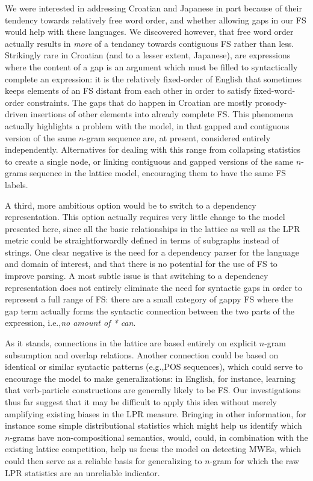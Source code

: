 \documentclass[11pt]{article}
\makeatletter
\def \eg {e.g.,\@ }
\def \ie {i.e.,\@ }
\newcommand{\ex}[1]{\textit{#1}\xspace}
\makeatother
\begin{document}
We were interested in addressing Croatian and Japanese in part because of their tendency towards relatively free word order, and whether allowing gaps in our FS would help with these languages. We discovered however, that free word order actually results in \emph{more} of a tendancy towards contiguous FS rather than less. Strikingly rare in Croatian (and to a lesser extent, Japanese), are expressions where the content of a gap is an argument which must be filled to syntactically complete an expression: it is the relatively fixed-order of English that sometimes keeps elements of an FS distant from each other in order to satisfy fixed-word-order constraints. The gaps that do happen in Croatian are mostly prosody-driven insertions of other elements into already complete FS. This phenomena actually highlights a problem with the model, in that gapped and contiguous version of the same $n$-gram sequence are, at present, considered entirely independently. Alternatives for dealing with this range from collapsing statistics to create a single node, or linking contiguous and gapped versions of the same $n$-grams sequence in the lattice model, encouraging them to have the same FS labels.

A third, more ambitious option would be to switch to a dependency representation. This option actually requires very little change to the model presented here, since all the basic relationships in the lattice as well as the LPR metric could be straightforwardly defined in terms of subgraphs instead of strings. One clear negative is the need for a dependency parser for the language and domain of interest, and that there is no potential for the use of FS to improve parsing. A most subtle issue is that switching to a dependency representation does not entirely eliminate the need for syntactic gaps in order to represent a full range of FS: there are a small category of gappy FS where the gap term actually forms the syntactic connection between the two parts of the expression, \ie \ex{no amount of * can}.

As it stands, connections in the lattice are based entirely on explicit $n$-gram subsumption and overlap relations. Another connection could be based on identical or similar syntactic patterns (\eg POS sequences), which could serve to encourage the model to make generalizations: in English, for instance, learning that verb-particle constructions are generally likely to be FS. Our investigations thus far suggest that it may be difficult to apply this idea without merely amplifying existing biases in the LPR measure. Bringing in other information, for instance some simple distributional statistics which might help us identify which $n$-grams have non-compositional semantics, would, could, in combination with the existing lattice competition, help us focus the model on detecting MWEs, which could then serve as a reliable basis for generalizing to $n$-gram for which the raw LPR statistics are an unreliable indicator.
\end{document}
